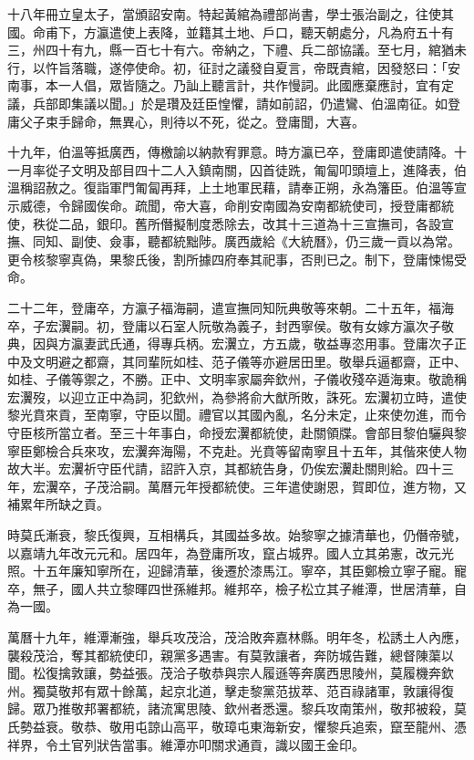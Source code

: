 \begin{pinyinscope}
十八年冊立皇太子，當頒詔安南。特起黃綰為禮部尚書，學士張治副之，往使其國。命甫下，方瀛遣使上表降，並籍其土地、戶口，聽天朝處分，凡為府五十有三，州四十有九，縣一百七十有六。帝納之，下禮、兵二部協議。至七月，綰猶未行，以忤旨落職，遂停使命。初，征討之議發自夏言，帝既責綰，因發怒曰：「安南事，本一人倡，眾皆隨之。乃訕上聽言計，共作慢詞。此國應棄應討，宜有定議，兵部即集議以聞。」於是瓚及廷臣惶懼，請如前詔，仍遣鸞、伯溫南征。如登庸父子束手歸命，無異心，則待以不死，從之。登庸聞，大喜。

十九年，伯溫等抵廣西，傳檄諭以納款宥罪意。時方瀛已卒，登庸即遣使請降。十一月率從子文明及部目四十二人入鎮南關，囚首徒跣，匍匐叩頭壇上，進降表，伯溫稱詔赦之。復詣軍門匍匐再拜，上土地軍民藉，請奉正朔，永為籓臣。伯溫等宣示威德，令歸國俟命。疏聞，帝大喜，命削安南國為安南都統使司，授登庸都統使，秩從二品，銀印。舊所僭擬制度悉除去，改其十三道為十三宣撫司，各設宣撫、同知、副使、僉事，聽都統黜陟。廣西歲給《大統曆》，仍三歲一貢以為常。更令核黎寧真偽，果黎氏後，割所據四府奉其祀事，否則已之。制下，登庸悚惕受命。

二十二年，登庸卒，方瀛子福海嗣，遣宣撫同知阮典敬等來朝。二十五年，福海卒，子宏瀷嗣。初，登庸以石室人阮敬為義子，封西寧侯。敬有女嫁方瀛次子敬典，因與方瀛妻武氏通，得專兵柄。宏瀷立，方五歲，敬益專恣用事。登庸次子正中及文明避之都齋，其同輩阮如桂、范子儀等亦避居田里。敬舉兵逼都齋，正中、如桂、子儀等禦之，不勝。正中、文明率家屬奔欽州，子儀收殘卒遁海東。敬詭稱宏瀷歿，以迎立正中為詞，犯欽州，為參將俞大猷所敗，誅死。宏瀷初立時，遣使黎光賁來貢，至南寧，守臣以聞。禮官以其國內亂，名分未定，止來使勿進，而令守臣核所當立者。至三十年事白，命授宏瀷都統使，赴關領牒。會部目黎伯驪與黎寧臣鄭檢合兵來攻，宏瀷奔海陽，不克赴。光賁等留南寧且十五年，其偕來使人物故大半。宏瀷祈守臣代請，詔許入京，其都統告身，仍俟宏瀷赴關則給。四十三年，宏瀷卒，子茂洽嗣。萬曆元年授都統使。三年遣使謝恩，賀即位，進方物，又補累年所缺之貢。

時莫氏漸衰，黎氏復興，互相構兵，其國益多故。始黎寧之據清華也，仍僭帝號，以嘉靖九年改元元和。居四年，為登庸所攻，竄占城界。國人立其弟憲，改元光照。十五年廉知寧所在，迎歸清華，後遷於漆馬江。寧卒，其臣鄭檢立寧子寵。寵卒，無子，國人共立黎暉四世孫維邦。維邦卒，檢子松立其子維潭，世居清華，自為一國。

萬曆十九年，維潭漸強，舉兵攻茂洽，茂洽敗奔嘉林縣。明年冬，松誘土人內應，襲殺茂洽，奪其都統使印，親黨多遇害。有莫敦讓者，奔防城告難，總督陳蕖以聞。松復擒敦讓，勢益張。茂洽子敬恭與宗人履遜等奔廣西思陵州，莫履機奔欽州。獨莫敬邦有眾十餘萬，起京北道，擊走黎黨范拔萃、范百祿諸軍，敦讓得復歸。眾乃推敬邦署都統，諸流寓思陵、欽州者悉還。黎兵攻南策州，敬邦被殺，莫氏勢益衰。敬恭、敬用屯諒山高平，敬璋屯東海新安，懼黎兵追索，竄至龍州、憑祥界，令土官列狀告當事。維潭亦叩關求通貢，識以國王金印。


\end{pinyinscope}
